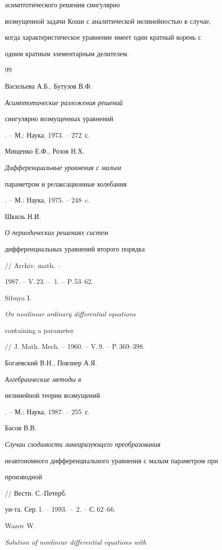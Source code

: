 асимптотического решения сингулярно


возмущенной задачи Коши с аналитической нелинейностью в случае,


когда характеристическое уравнение имеет один кратный корень с


одним кратным элементарным делителем.








\begin{thebibliography}{99} 


 




Васильева А.Б., Бутузов В.Ф. {\em Асимптотические разложения решений


сингулярно возмущенных уравнений}. -- М.: Наука, 1973. -- 272~с.




Мищенко Е.Ф., Розов Н.Х. {\em Дифференциальные уравнения с малым


параметром и релаксационные колебания}. -- М.: Наука, 1975. -- 248~c.




Шкиль Н.И. {\em О периодических решениях систем 


дифференциальных уравнений второго порядка} // Archiv. math. --


1987. -- V.\,23. -- \No\,1. -- P.\,53--62.




Sibuya I. {\em On nonlinear ordinary differential equations


containing a parameter} // J. Math. Mech. -- 1960. -- V.\,9. -- P.\,369--398.




Богаевский В.Н., Повзнер А.Я. {\em Алгебраические методы в


нелинейной теории возмущений}. -- М.: Наука, 1987. -- 255~с.




Басов В.В. {\em Случаи сходимости линеаризующего преобразования


неавтономного дифференциального уравнения с малым параметром при


производной} // Вестн. С.-Петерб.


ун-та. Сер.\,1. -- 1993. -- \No\,2. -- С.\,62--66.




Wazov W. {\em Solution of nonlinear differential equations with


}
\end{thebibliography}
